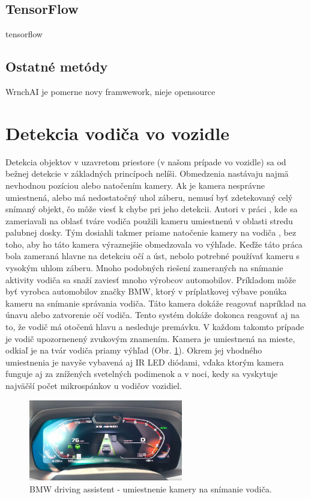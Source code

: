 \documentclass[slovak,master,dept460,male,cpp,cpdeclaration]{diploma}
\begin{document}
\newpage
\subsection{TensorFlow}
tensorflow


\newpage
\subsection{Ostatné metódy}
WrnchAI je pomerne novy framwework, nieje  opensource

\newpage
\section{Detekcia vodiča vo vozidle}
\label{sec:Pose detection}
Detekcia objektov v uzavretom priestore (v našom prípade vo vozidle) sa od bežnej detekcie v základných princípoch nelíši. Obmedzenia nastávaju najmä nevhodnou pozíciou alebo natočením kamery. Ak je kamera nesprávne umiestnená, alebo má nedostatočný uhol záberu, nemusí byť zdetekovaný celý snímaný objekt, čo môže viesť k chybe pri jeho detekcii. Autori v práci \cite{smith2003determining}, kde sa zameriavali na oblasť tváre vodiča použili kameru umiestnenú v oblasti stredu palubnej dosky. Tým dosiahli takmer priame natočenie kamery na vodiča , bez toho, aby ho táto kamera výraznejšie obmedzovala vo výhľade. Keďže táto práca bola zameraná hlavne na detekciu  očí a úst, nebolo potrebné  používať kameru s vysokým uhlom záberu. Mnoho podobných riešení zameraných na snímanie aktivity vodiča sa snaží zaviesť mnoho výrobcov automobilov. Príkladom môže byť vyrobca  automobilov značky BMW, ktorý v príplatkovej výbave ponúka kameru na snímanie správania vodiča. Táto kamera dokáže reagovať napríklad na únavu alebo zatvorenie očí vodiča. Tento systém dokáže dokonca reagovať aj na to, že vodič má otočenú hlavu a nesleduje premávku. V každom takomto prípade je vodič upozornenený zvukovým znamením. Kamera je umiestnená na mieste, odkiaľ je na tvár vodiča priamy výhľad (Obr. \ref{fig:bmwAssistent}). Okrem jej vhodného umiestnenia je navyše vybavená aj IR LED diódami, vďaka ktorým kamera funguje aj za znížených svetelných podimenok a v noci, kedy sa vyskytuje najväčší počet mikrospánkov u vodičov vozidiel.

\begin{figure}[H]
	\centering
	\includegraphics[width=0.6\textwidth]{Figures/bmw.jpg}
	\caption{BMW driving assistent - umiestnenie kamery na snímanie vodiča.\cite{bmw2019assistent}}
	\label{fig:bmwAssistent}
\end{figure}
\end{document}
